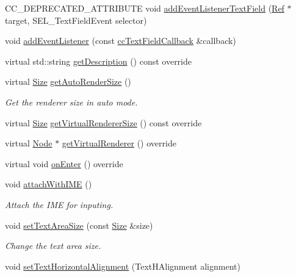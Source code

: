 \begin{DoxyCompactItemize}
C\+C\+\_\+\+D\+E\+P\+R\+E\+C\+A\+T\+E\+D\+\_\+\+A\+T\+T\+R\+I\+B\+U\+TE void \hyperlink{classui_1_1TextField_a7ca15003baf609a5333d438e1baa97d3}{add\+Event\+Listener\+Text\+Field} (\hyperlink{classRef}{Ref} $\ast$target, S\+E\+L\+\_\+\+Text\+Field\+Event selector)
\item 
void \hyperlink{classui_1_1TextField_a2fb48806ef4efd12c4d7db8f58956509}{add\+Event\+Listener} (const \hyperlink{classui_1_1TextField_a8b58cb15659d59187cfa0586d1420f1f}{cc\+Text\+Field\+Callback} \&callback)
\item 
virtual std\+::string \hyperlink{classui_1_1TextField_ad3dd2bd1a5d8d501e63d5922c95c1bc2}{get\+Description} () const override
\item 
virtual \hyperlink{classSize}{Size} \hyperlink{classui_1_1TextField_a8f29bc576be33084471fb5b9bb169f5b}{get\+Auto\+Render\+Size} ()
\begin{DoxyCompactList}\small\item\em Get the renderer size in auto mode. \end{DoxyCompactList}\item 
virtual \hyperlink{classSize}{Size} \hyperlink{classui_1_1TextField_a1eb2eb5212ee89b2f54dad80bd9a22ca}{get\+Virtual\+Renderer\+Size} () const override
\item 
virtual \hyperlink{classNode}{Node} $\ast$ \hyperlink{classui_1_1TextField_a517f950a59caa4ec02a9245beb6d7283}{get\+Virtual\+Renderer} () override
\item 
virtual void \hyperlink{classui_1_1TextField_a8798bcf6c7f3540b7c078338386c04a3}{on\+Enter} () override
\item 
\mbox{\label{classui_1_1TextField_a72f0480d878a33b11b355f755fde6d7c}} 
void \hyperlink{classui_1_1TextField_a72f0480d878a33b11b355f755fde6d7c}{attach\+With\+I\+ME} ()
\begin{DoxyCompactList}\small\item\em Attach the I\+ME for inputing. \end{DoxyCompactList}\item 
void \hyperlink{classui_1_1TextField_aef44e7dff3cdd16328b4d2101b9b6dfb}{set\+Text\+Area\+Size} (const \hyperlink{classSize}{Size} \&size)
\begin{DoxyCompactList}\small\item\em Change the text area size. \end{DoxyCompactList}\item 
void \hyperlink{classui_1_1TextField_a5cb293b70c2aa7f8f7c91a9a17376a65}{set\+Text\+Horizontal\+Alignment} (Text\+H\+Alignment alignment)

\end{DoxyCompactItemize}

